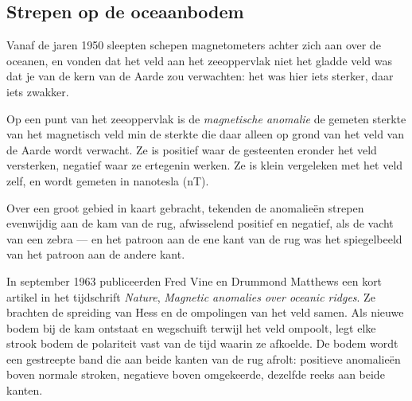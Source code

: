 \subsection{Strepen op de oceaanbodem}

Vanaf de jaren 1950 sleepten schepen magnetometers achter zich aan over de oceanen,
en vonden dat het veld aan het zeeoppervlak niet het gladde veld was dat je van de
kern van de Aarde zou verwachten: het was hier iets sterker, daar iets zwakker.

\begin{definition}\label{def:g11:drift-to-spreading:anomaly}
Op een punt van het zeeoppervlak is de
\emph{magnetische anomalie} de gemeten sterkte van het
magnetisch veld min de sterkte die daar alleen op grond van het veld van de Aarde
wordt verwacht. Ze is positief waar de gesteenten eronder het veld versterken,
negatief waar ze ertegenin werken. Ze is klein vergeleken met het veld zelf, en
wordt gemeten in nanotesla (\unit{nT}).
\end{definition}

Over een groot gebied in kaart gebracht, tekenden de anomalieën strepen evenwijdig
aan de kam van de rug, afwisselend positief en negatief, als de vacht van een zebra
--- en het patroon aan de ene kant van de rug was het spiegelbeeld van het
patroon aan de andere kant.

\begin{history}
In september 1963 publiceerden Fred Vine en Drummond Matthews een kort artikel in het tijdschrift \emph{Nature},
\emph{Magnetic anomalies over oceanic ridges}. Ze brachten de spreiding van Hess
en de ompolingen van het veld samen. Als nieuwe bodem bij de kam ontstaat en
wegschuift terwijl het veld ompoolt, legt elke strook bodem de polariteit vast van
de tijd waarin ze afkoelde. De bodem wordt een gestreepte band die aan beide
kanten van de rug afrolt: positieve anomalieën boven normale stroken, negatieve
boven omgekeerde, dezelfde reeks aan beide kanten.
\end{history}

